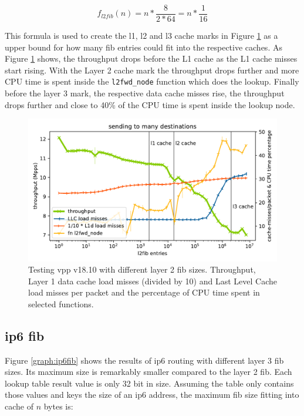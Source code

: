 $$ f_{l2fib}(n) = n * \frac{8}{2 * 64} = n * \frac{1}{16}  $$

This formula is used to create the l1, l2 and l3 cache marks in Figure
\ref{graph:l2fib} as a upper bound for how many fib entries could fit
into the respective caches. As Figure \ref{graph:l2fib} shows, the throughput drops before the L1
cache as the L1 cache misses start rising. With the Layer 2 cache mark
the throughput drops further and more CPU time is spent inside the
\lstinline|l2fwd_node| function which does the lookup. Finally before
the layer 3 mark, the respective data cache misses rise, the
throughput drops further and close to 40\% of the CPU time is spent
inside the lookup node.


\begin{figure}[!ht]
\noindent\hspace{0.5mm}\includegraphics[width=\linewidth]{pics/throughput_l2_throughmac_klaipeda32ghz_v3.pdf}
\caption{Testing \Ac{vpp} v18.10 with different layer 2 \Ac{fib} sizes. Throughput, Layer 1 data cache load misses (divided by 10) and Last Level Cache load misses per packet and the percentage of CPU time spent in selected functions. }
\label{graph:l2fib}
\end{figure}

\newpage

\subsection{\Ac{ip6} \Ac{fib}}

Figure \ref{graph:ip6fib} shows the results of \Ac{ip6} routing with
different layer 3 \Ac{fib} sizes. Its maximum size is remarkably
smaller compared to the layer 2 \Ac{fib}. Each lookup table result
value is only 32 bit in size. Assuming the table only contains those
values and keys the size of an \Ac{ip6} address, the maximum \Ac{fib}
size fitting into cache of $n$ bytes is:

